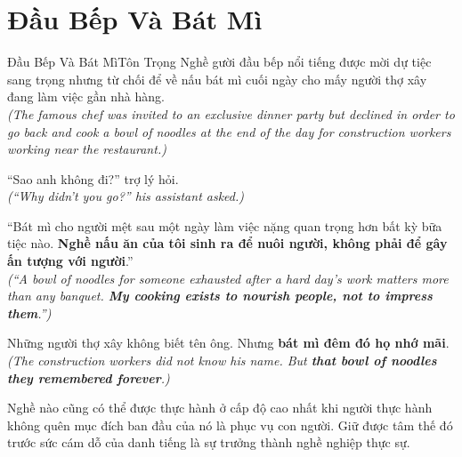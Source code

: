 \section{Đầu Bếp Và Bát Mì}
\begin{truyen}{Đầu Bếp Và Bát Mì}{Tôn Trọng Nghề}
gười đầu bếp nổi tiếng được mời dự tiệc sang trọng nhưng từ chối để về nấu bát mì cuối ngày cho mấy người thợ xây đang làm việc gần nhà hàng.\\
\textit{(The famous chef was invited to an exclusive dinner party but declined in order to go back and cook a bowl of noodles at the end of the day for construction workers working near the restaurant.)}

``Sao anh không đi?'' trợ lý hỏi.\\
\textit{(``Why didn't you go?'' his assistant asked.)}

``Bát mì cho người mệt sau một ngày làm việc nặng quan trọng hơn bất kỳ bữa tiệc nào. \textbf{Nghề nấu ăn của tôi sinh ra để nuôi người, không phải để gây ấn tượng với người}.''\\
\textit{(``A bowl of noodles for someone exhausted after a hard day's work matters more than any banquet. \textbf{My cooking exists to nourish people, not to impress them}.'')}

Những người thợ xây không biết tên ông. Nhưng \textbf{bát mì đêm đó họ nhớ mãi}.\\
\textit{(The construction workers did not know his name. But \textbf{that bowl of noodles they remembered forever}.)}
\end{truyen}
\begin{baihoc}
  Nghề nào cũng có thể được thực hành ở cấp độ cao nhất khi người thực hành không quên mục đích ban đầu của nó là phục vụ con người. Giữ được tâm thế đó trước sức cám dỗ của danh tiếng là sự trưởng thành nghề nghiệp thực sự.
\end{baihoc}

